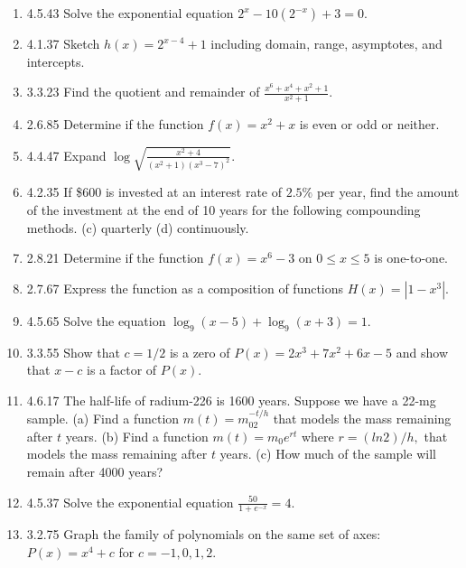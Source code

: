 \documentclass[11pt]{article}
\begin{document}
\begin{enumerate}
\item 4.5.43 Solve the exponential equation $2^x-10(2^{-x})+3=0.$

\item 4.1.37 Sketch $h(x)=2^{x-4}+1$  including domain, range, asymptotes, and intercepts.

\item 3.3.23 Find the quotient and remainder of $\frac{x^6+x^4+x^2+1}{x^2+1}.$

\item 2.6.85 Determine if the function $f(x)=x^2+x$ is even or odd or neither.

\item 4.4.47 Expand $\log \sqrt{\frac{x^2+4}{(x^2+1)(x^3-7)^2}}.$

\item 4.2.35 If \$600 is invested at an interest rate of $2.5\%$ per year, find the amount of the investment at the end of 10 years for the following compounding methods. (c) quarterly (d) continuously.

\item 2.8.21 Determine if the function $f(x)=x^6-3$ on $0 \leq x \leq 5$ is one-to-one.

\item 2.7.67 Express the function as a composition of functions $H(x)=|1-x^3|.$

\item 4.5.65 Solve the equation $\log_9 (x-5) +\log_9 (x+3)=1.$

\item 3.3.55 Show that $c=1/2$ is a zero of $P(x)=2x^3+7x^2+6x-5$ and show that $x-c$ is a factor of $P(x).$
\item 4.6.17 The half-life of radium-226 is 1600 years. Suppose we have a 22-mg sample. (a) Find a function $m(t)=m_02^{-t/h}$ that models the mass remaining after $t$ years. (b) Find a function $m(t)=m_0e^{rt}$ where $r=(ln 2)/h,$ that models the mass remaining after $t$ years. (c) How much of the sample will remain after 4000 years?\\

\item 4.5.37 Solve the exponential equation $\frac{50}{1+e^{-x}}=4.$

\item 3.2.75 Graph the family of polynomials on the same set of axes: $P(x)=x^4+c$ for $c=-1,0,1,2.$


\end{enumerate}
\end{document}
